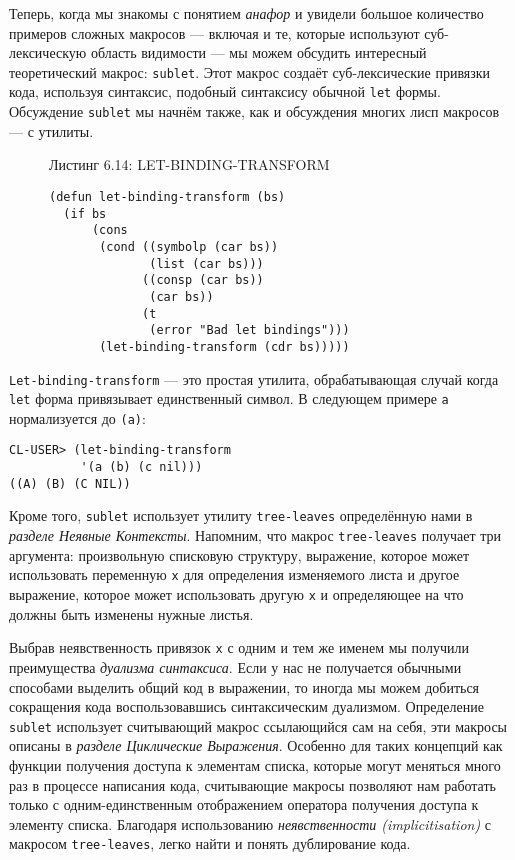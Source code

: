 Теперь, когда мы знакомы с понятием \emph{анафор} и увидели большое количество примеров сложных макросов --- включая и те, которые используют суб-лексическую область видимости --- мы можем обсудить интересный теоретический макрос: \verb"sublet". Этот макрос создаёт суб-лексические привязки кода, используя синтаксис, подобный синтаксису обычной \verb"let" формы. Обсуждение \verb"sublet" мы начнём также, как и обсуждения многих лисп макросов --- с утилиты.

\begin{figure}Листинг 6.14: LET-BINDING-TRANSFORM\label{listing_6.14}
\listbegin
\begin{verbatim}
(defun let-binding-transform (bs)
  (if bs
      (cons
       (cond ((symbolp (car bs))
              (list (car bs)))
             ((consp (car bs))
              (car bs))
             (t
              (error "Bad let bindings")))
       (let-binding-transform (cdr bs)))))
\end{verbatim}
\listend
\end{figure}

\verb"Let-binding-transform" --- это простая утилита, обрабатывающая случай когда \verb"let" форма привязывает единственный символ. В следующем примере \verb"a" нормализуется до \verb"(a)":

\begin{verbatim}
CL-USER> (let-binding-transform
          '(a (b) (c nil)))
((A) (B) (C NIL))
\end{verbatim}

Кроме того, \verb"sublet" использует утилиту \verb"tree-leaves" определённую нами в \emph{разделе Неявные Контексты}. Напомним, что макрос \verb"tree-leaves" получает три аргумента: произвольную списковую структуру, выражение, которое может использовать переменную \verb"x" для определения изменяемого листа и другое выражение, которое может использовать другую \verb"x" и определяющее на что должны быть изменены нужные листья.

Выбрав неявственность привязок \verb"x" с одним и тем же именем мы получили преимущества \emph{дуализма синтаксиса}. Если у нас не получается обычными способами выделить общий код в выражении, то иногда мы можем добиться сокращения кода воспользовавшись синтаксическим дуализмом. Определение \verb"sublet" использует считывающий макрос ссылающийся сам на себя, эти макросы описаны в \emph{разделе Циклические Выражения}. Особенно для таких концепций как функции получения доступа к элементам списка, которые могут меняться много раз в процессе написания кода, считывающие макросы позволяют нам работать только с одним-единственным отображением оператора получения доступа к элементу списка. Благодаря использованию \emph{неявственности (implicitisation)} с макросом \verb"tree-leaves", легко найти и понять дублирование кода.

